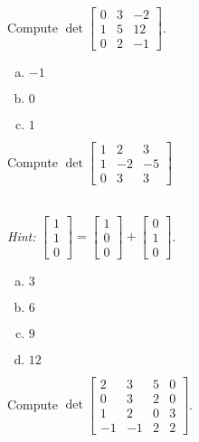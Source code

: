 \begin{applicationActivities}
\begin{activity}{5}
  Compute   $\det \begin{bmatrix} 0 & 3 & -2 \\ 1 & 5 & 12 \\ 0 & 2 & -1 \end{bmatrix}$.
  \ \\
  \begin{multicols}{3}
  \begin{enumerate}[(a)]
  \item $-1$
  \item $0$
  \item $1$
  \end{enumerate}
  \end{multicols}
\end{activity}

\begin{activity}{10}
  Compute $\det \begin{bmatrix} 1 & 2 & 3 \\ 1 & -2 & -5 \\ 0 & 3 & 3 \end{bmatrix}$

\ \\

  {\em Hint:} $\begin{bmatrix} 1 \\ 1 \\ 0 \end{bmatrix} = \begin{bmatrix} 1 \\ 0 \\ 0 \end{bmatrix} + \begin{bmatrix} 0 \\ 1 \\ 0 \end{bmatrix}$.

  \begin{multicols}{4}
  \begin{enumerate}[(a)]
  \item $3$
  \item $6$
  \item $9$
  \item $12$
  \end{enumerate}
  \end{multicols}
  \end{activity}

\begin{activity}{15}
  Compute  $\det \begin{bmatrix} 2 & 3 & 5 & 0 \\ 0 & 3 & 2 & 0 \\ 1 & 2 & 0 & 3 \\ -1 & -1 & 2 & 2 \end{bmatrix}$.


\end{activity}
\end{applicationActivities}
